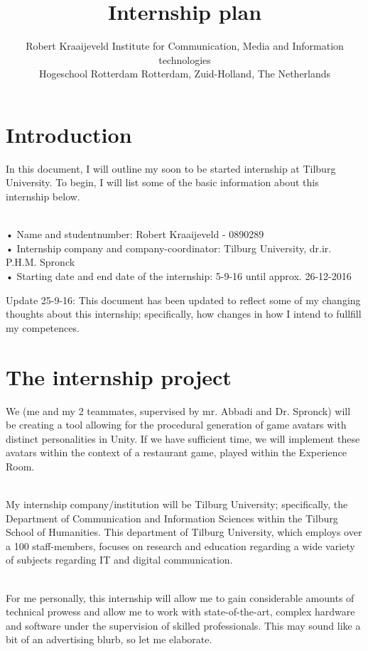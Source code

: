 \documentclass[11pt]{article}
\title{\Huge Internship plan}
\author{Robert Kraaijeveld 
	Institute for Communication, Media and Information technologies\\
	Hogeschool Rotterdam
	Rotterdam, Zuid-Holland, The Netherlands \\
	}
\begin{document}
\nocite{*}
\date{}
\maketitle
{}
\rhead{}
\lfoot{}
\cfoot{}

\newpage
\tableofcontents
\pagebreak

\newpage
{}
{}
\section*{Introduction}
In this document, I will outline my soon to be started internship at Tilburg University.
To begin, I will list some of the basic information about this internship below.

~\\
• Name and studentnumber: Robert Kraaijeveld - 0890289
~\\
• Internship company and company-coordinator: Tilburg University, dr.ir. P.H.M.
Spronck
~\\
• Starting date and end date of the internship: 5-9-16 until approx. 26-12-2016

Update 25-9-16: This document has been updated to reflect some of my changing thoughts about this internship; specifically, how changes in how I intend to fullfill my competences.

\newpage
\section{The internship project}
We (me and my 2 teammates, supervised by mr. Abbadi and Dr. Spronck) will be
creating a tool allowing for the procedural generation of game avatars with distinct
personalities in Unity. If we have sufficient time, we will implement these avatars within
the context of a restaurant game, played within the Experience Room.

~\\
My internship company/institution will be Tilburg University; specifically, the Department
of Communication and Information Sciences within the Tilburg School of Humanities.
This department of Tilburg University, which employs over a 100 staff-members,
focuses on research and education regarding a wide variety of subjects regarding IT and
digital communication.

~\\
For me personally, this internship will allow me to gain considerable amounts of technical
prowess and allow me to work with state-of-the-art, complex hardware and software
under the supervision of skilled professionals. This may sound like a bit of an advertising
blurb, so let me elaborate.
\end{document}
